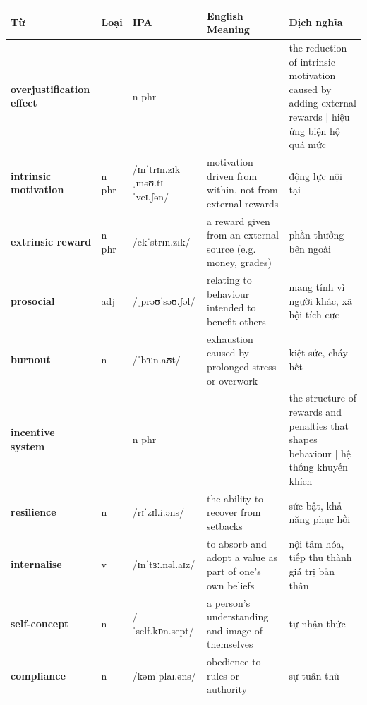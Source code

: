\vspace{0.8em}
\begin{center}
\renewcommand{\arraystretch}{1.65}
\begin{tabularx}{\textwidth}{|V{0.22\textwidth}|C{0.07\textwidth}|I{0.20\textwidth}|Y|V{0.18\textwidth}|}
\hline
{}
\textbf{Từ} & \textbf{Loại} & \textbf{IPA} & \textbf{English Meaning} & \textbf{Dịch nghĩa} \\
\hline
\textbf{overjustification effect} & & n phr & & the reduction of intrinsic motivation caused by adding external rewards | hiệu ứng biện hộ quá mức \\ \hline
\textbf{intrinsic motivation} & n phr & /ɪnˈtrɪn.zɪk ˌməʊ.tɪˈveɪ.ʃən/ & motivation driven from within, not from external rewards & động lực nội tại \\ \hline
\textbf{extrinsic reward} & n phr & /ekˈstrɪn.zɪk/ & a reward given from an external source (e.g. money, grades) & phần thưởng bên ngoài \\ \hline
\textbf{prosocial} & adj & /ˌprəʊˈsəʊ.ʃəl/ & relating to behaviour intended to benefit others & mang tính vì người khác, xã hội tích cực \\ \hline
\textbf{burnout} & n & /ˈbɜːn.aʊt/ & exhaustion caused by prolonged stress or overwork & kiệt sức, cháy hết \\ \hline
\textbf{incentive system} & & n phr & & the structure of rewards and penalties that shapes behaviour | hệ thống khuyến khích \\ \hline
\textbf{resilience} & n & /rɪˈzɪl.i.əns/ & the ability to recover from setbacks & sức bật, khả năng phục hồi \\ \hline
\textbf{internalise} & v & /ɪnˈtɜː.nəl.aɪz/ & to absorb and adopt a value as part of one's own beliefs & nội tâm hóa, tiếp thu thành giá trị bản thân \\ \hline
\textbf{self-concept} & n & /ˈself.kɒn.sept/ & a person's understanding and image of themselves & tự nhận thức \\ \hline
\textbf{compliance} & n & /kəmˈplaɪ.əns/ & obedience to rules or authority & sự tuân thủ \\ \hline
\end{tabularx}
\end{center}

\newpage

